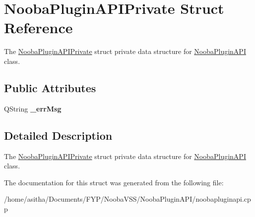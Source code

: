 \hypertarget{struct_nooba_plugin_a_p_i_private}{\section{Nooba\-Plugin\-A\-P\-I\-Private Struct Reference}
\label{struct_nooba_plugin_a_p_i_private}
}


The \hyperlink{struct_nooba_plugin_a_p_i_private}{Nooba\-Plugin\-A\-P\-I\-Private} struct private data structure for \hyperlink{class_nooba_plugin_a_p_i}{Nooba\-Plugin\-A\-P\-I} class.  


\subsection*{Public Attributes}
\begin{DoxyCompactItemize}
\item 
\hypertarget{struct_nooba_plugin_a_p_i_private_aa45461d4401bdab4c21b4d4f2a074227}{Q\-String {\bfseries \-\_\-err\-Msg}}\label{struct_nooba_plugin_a_p_i_private_aa45461d4401bdab4c21b4d4f2a074227}

\end{DoxyCompactItemize}


\subsection{Detailed Description}
The \hyperlink{struct_nooba_plugin_a_p_i_private}{Nooba\-Plugin\-A\-P\-I\-Private} struct private data structure for \hyperlink{class_nooba_plugin_a_p_i}{Nooba\-Plugin\-A\-P\-I} class. 

The documentation for this struct was generated from the following file\-:\begin{DoxyCompactItemize}
\item 
/home/asitha/\-Documents/\-F\-Y\-P/\-Nooba\-V\-S\-S/\-Nooba\-Plugin\-A\-P\-I/noobapluginapi.\-cpp\end{DoxyCompactItemize}
